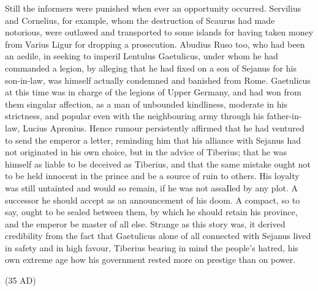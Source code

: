 Still the informers were punished when ever an opportunity occurred. Servilius and Cornelius, for example, whom the destruction of Scaurus had made notorious, were outlawed and transported to some islands for having taken money from Varius Ligur for dropping a prosecution. Abudius Ruso too, who had been an aedile, in seeking to imperil Lentulus Gaetulicus, under whom he had commanded a legion, by alleging that he had fixed on a son of Sejanus for his son-in-law, was himself actually condemned and banished from Rome. Gaetulicus at this time was in charge of the legions of Upper Germany, and had won from them singular affection, as a man of unbounded kindliness, moderate in his strictness, and popular even with the neighbouring army through his father-in-law, Lucius Apronius. Hence rumour persistently affirmed that he had ventured to send the emperor a letter, reminding him that his alliance with Sejanus had not originated in his own choice, but in the advice of Tiberius; that he was himself as liable to be deceived as Tiberius, and that the same mistake ought not to be held innocent in the prince and be a source of ruin to others. His loyalty was still untainted and would so remain, if he was not assaIled by any plot. A successor he should accept as an announcement of his doom. A compact, so to say, ought to be sealed between them, by which he should retain his province, and the emperor be master of all else. Strange as this story was, it derived credibility from the fact that Gaetulicus alone of all connected with Sejanus lived in safety and in high favour, Tiberius bearing in mind the people's hatred, his own extreme age how his government rested more on prestige than on power.


(35 AD)

